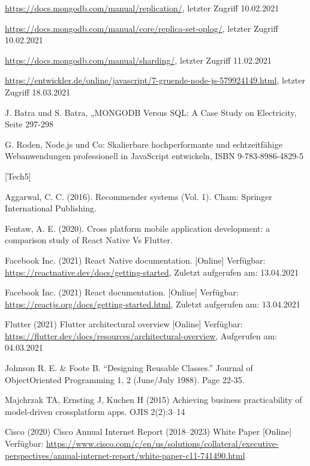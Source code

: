 \documentclass[11pt,a4paper]{article}
\begin{document}
\begin{itemize}
 \url{https://docs.mongodb.com/manual/replication/}, letzter Zugriff 10.02.2021

 \url{https://docs.mongodb.com/manual/core/replica-set-oplog/}, letzter Zugriff 10.02.2021

 \url{https://docs.mongodb.com/manual/sharding/}, letzter Zugriff 11.02.2021

%
%
%
%


 \url{https://entwickler.de/online/javascript/7-gruende-node-js-579924149.html}, letzter Zugriff 18.03.2021 

 J. Batra und S. Batra, „MONGODB Versus SQL: A Case Study on Electricity, Seite 297-298

 G. Roden, Node.js und Co: Skalierbare hochperformante und echtzeitfähige Webanwendungen professionell in JavaScript entwickeln, ISBN 9-783-8986-4829-5 

[Tech5] 


%
%
%			
%
%


	 Aggarwal, C. C. (2016). Recommender systems (Vol. 1). Cham: Springer International Publishing.

	 Fentaw, A. E. (2020). Cross platform mobile application development: a comparison study of React Native Vs Flutter.

	 Facebook Inc. (2021) React Native documentation. [Online] Verfügbar: \url{https://reactnative.dev/docs/getting-started}, Zuletzt aufgerufen am: 13.04.2021

	 Facebook Inc. (2021) React documentation. [Online] Verfügbar: \url{https://reactjs.org/docs/getting-started.html}, Zuletzt aufgerufen am: 13.04.2021

	 Flutter (2021) Flutter architectural overview [Online] Verfügbar: \url{https://flutter.dev/docs/resources/architectural-overview}, Aufgerufen am: 04.03.2021

	 Johnson R. E. \&  Foote B. “Designing Reusable Classes.” Journal of ObjectOriented Programming 1, 2 (June/July 1988). Page 22-35.

	 Majchrzak TA, Ernsting J, Kuchen H (2015) Achieving business practicability of model-driven crossplatform apps. OJIS 2(2):3–14

	 Cisco (2020) Cisco Annual Internet Report (2018–2023) White Paper [Online] Verfügbar: \url{https://www.cisco.com/c/en/us/solutions/collateral/executive-perspectives/annual-internet-report/white-paper-c11-741490.html}


\end{itemize}
\end{document}
